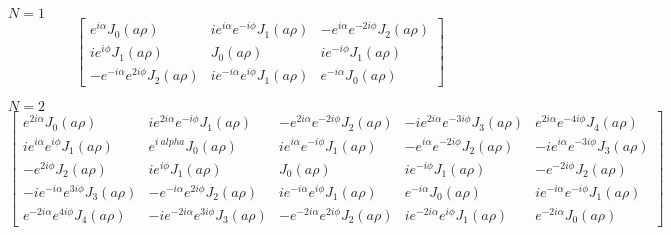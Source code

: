 \documentclass{article}
\begin{document}
$N=1$
\[
\left[\begin{matrix}e^{i \alpha} J_{0}\left(a \rho\right) & i e^{i \alpha} e^{- i \phi} J_{1}\left(a \rho\right) & - e^{i \alpha} e^{- 2 i \phi} J_{2}\left(a \rho\right)\\i e^{i
 \phi} J_{1}\left(a \rho\right) & J_{0}\left(a \rho\right) & i e^{- i \phi} J_{1}\left(a \rho\right)\\- e^{- i \alpha} e^{2 i \phi} J_{2}\left(a \rho\right) & i e^{- i \alpha} e
^{i \phi} J_{1}\left(a \rho\right) & e^{- i \alpha} J_{0}\left(a \rho\right)\end{matrix}\right]
\]

$N=2$
\[
\left[\begin{matrix}e^{2 i \alpha} J_{0}\left(a \rho\right) & i e^{2 i \alpha} e^{- i \phi} J_{1}\left(a \rho\right) & - e^{2 i \alpha} e^{- 2 i \phi} J_{2}\left(a \rho\right) &
 - i e^{2 i \alpha} e^{- 3 i \phi} J_{3}\left(a \rho\right) & e^{2 i \alpha} e^{- 4 i \phi} J_{4}\left(a \rho\right)\\i e^{i \alpha} e^{i \phi} J_{1}\left(a \rho\right) & e^{i \
alpha} J_{0}\left(a \rho\right) & i e^{i \alpha} e^{- i \phi} J_{1}\left(a \rho\right) & - e^{i \alpha} e^{- 2 i \phi} J_{2}\left(a \rho\right) & - i e^{i \alpha} e^{- 3 i \phi}
 J_{3}\left(a \rho\right)\\- e^{2 i \phi} J_{2}\left(a \rho\right) & i e^{i \phi} J_{1}\left(a \rho\right) & J_{0}\left(a \rho\right) & i e^{- i \phi} J_{1}\left(a \rho\right) &
 - e^{- 2 i \phi} J_{2}\left(a \rho\right)\\- i e^{- i \alpha} e^{3 i \phi} J_{3}\left(a \rho\right) & - e^{- i \alpha} e^{2 i \phi} J_{2}\left(a \rho\right) & i e^{- i \alpha}
e^{i \phi} J_{1}\left(a \rho\right) & e^{- i \alpha} J_{0}\left(a \rho\right) & i e^{- i \alpha} e^{- i \phi} J_{1}\left(a \rho\right)\\e^{- 2 i \alpha} e^{4 i \phi} J_{4}\left(
a \rho\right) & - i e^{- 2 i \alpha} e^{3 i \phi} J_{3}\left(a \rho\right) & - e^{- 2 i \alpha} e^{2 i \phi} J_{2}\left(a \rho\right) & i e^{- 2 i \alpha} e^{i \phi} J_{1}\left(
a \rho\right) & e^{- 2 i \alpha} J_{0}\left(a \rho\right)\end{matrix}\right]
\]
\end{document}
